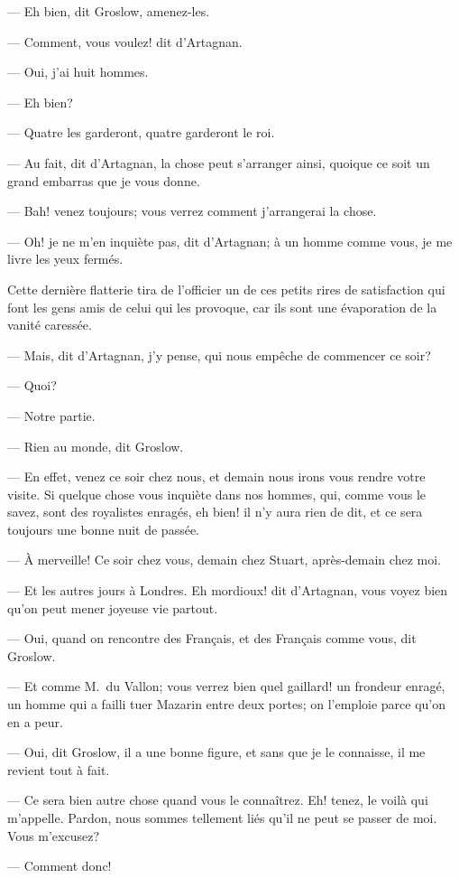 — Eh bien, dit Groslow, amenez-les.

— Comment, vous voulez! dit d'Artagnan.

— Oui, j'ai huit hommes.

— Eh bien?

— Quatre les garderont, quatre garderont le roi.

— Au fait, dit d'Artagnan, la chose peut s'arranger ainsi, quoique ce soit un grand embarras que je vous donne.

— Bah! venez toujours; vous verrez comment j'arrangerai la chose.

— Oh! je ne m'en inquiète pas, dit d'Artagnan; à un homme comme vous, je me livre les yeux fermés.

Cette dernière flatterie tira de l'officier un de ces petits rires de satisfaction qui font les gens amis de celui qui les provoque, car ils sont une évaporation de la vanité caressée.

— Mais, dit d'Artagnan, j'y pense, qui nous empêche de commencer ce soir?

— Quoi?

— Notre partie.

— Rien au monde, dit Groslow.

— En effet, venez ce soir chez nous, et demain nous irons vous rendre votre visite. Si quelque chose vous inquiète dans nos hommes, qui, comme vous le savez, sont des royalistes enragés, eh bien! il n'y aura rien de dit, et ce sera toujours une bonne nuit de passée.

— À merveille! Ce soir chez vous, demain chez Stuart, après-demain chez moi.

— Et les autres jours à Londres. Eh mordioux! dit d'Artagnan, vous voyez bien qu'on peut mener joyeuse vie partout.

— Oui, quand on rencontre des Français, et des Français comme vous, dit Groslow.

— Et comme M.~du Vallon; vous verrez bien quel gaillard! un frondeur enragé, un homme qui a failli tuer Mazarin entre deux portes; on l'emploie parce qu'on en a peur.

— Oui, dit Groslow, il a une bonne figure, et sans que je le connaisse, il me revient tout à fait.

— Ce sera bien autre chose quand vous le connaîtrez. Eh! tenez, le voilà qui m'appelle. Pardon, nous sommes tellement liés qu'il ne peut se passer de moi. Vous m'excusez?

— Comment donc!

